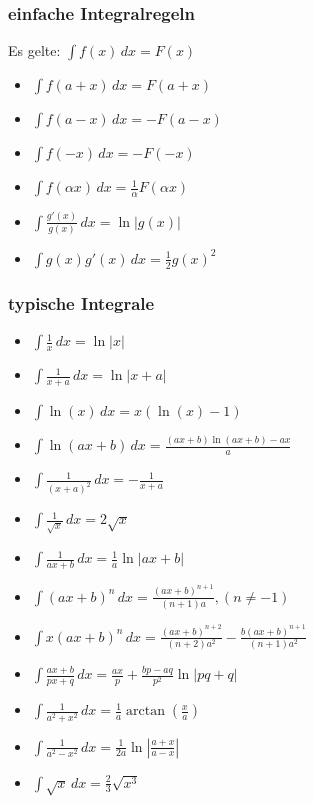 \subsubsection{einfache Integralregeln}
Es gelte: $\int f(x) \, dx = F(x)$
\begin{itemize}[leftmargin=*]
	\item $\int f(a + x) \,dx = F(a + x)$
	\item $\int f(a - x) \,dx = -F(a-x)$
	\item $\int f(-x) \,dx = -F(-x)$
	\item $\int f(\alpha x) \,dx = \frac{1}{\alpha}F(\alpha x)$
	\item $\int \frac{g'(x)}{g(x)} \, dx = \ln|g(x)|$
	\item $\int g(x)g'(x) \, dx = \frac{1}{2}g(x)^2$
\end{itemize}
\subsubsection{typische Integrale}
\begin{itemize}[leftmargin=*]
  	\item $\int \frac{1}{x} \,dx = \ln |x|$
  	\item $\int \frac{1}{x+a} \,dx = \ln |x+a|$
  	\item $\int \ln(x) \,dx = x(\ln(x) - 1)$
  	\item $\int \ln(ax + b) \,dx = \frac{(a x+b) \ln (a x+b)-a x}{a}$
  	\item $\int \frac{1}{(x+a)^2} \,dx = - \frac{1}{x+a}$
  	\item $\int \frac{1}{\sqrt{x}} \,dx = 2 \sqrt{x}$
	\item $\int \frac{1}{ax+b} \,dx = \frac{1}{a} \ln |ax+b|$
	\item $\int(ax + b)^n \,dx = \frac{(ax + b)^{n+1}}{(n + 1)a}, (n \neq -1)$
	\item $\int x(ax+b)^n \,dx = \frac{(ax + b)^{n+2}}{(n+2)a^2} -
	\frac{b(ax+b)^{n+1}}{(n+1)a^2}$
	\item $\int \frac{ax + b}{px + q} \,dx = \frac{ax}{p} + \frac{bp - aq}{p^2} \ln
	|pq+q|$
	\item $\int \frac{1}{a^2 + x^2} \,dx = \frac{1}{a} \arctan(\frac{x}{a})$
	\item $\int \frac{1}{a^2 - x^2} \,dx = \frac{1}{2a} \ln \left | \frac{a+x}{a-x}
	\right |$
	\item $\int \sqrt{x} \,dx = \frac{2}{3}\sqrt{x^3}$
\end{itemize}

